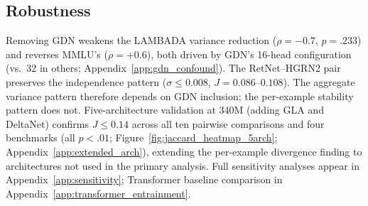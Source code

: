 \subsection{Robustness}\label{ssec:robustness}

Removing GDN weakens the LAMBADA variance reduction ($\rho = -0.7$, $p = .233$) and reverses MMLU's ($\rho = +0.6$), both driven by GDN's 16-head configuration (vs.\ 32 in others; Appendix~\ref{app:gdn_confound}). The RetNet--HGRN2 pair preserves the independence pattern ($\sigma \leq 0.008$, $J = 0.086$--$0.108$). The aggregate variance pattern therefore depends on GDN inclusion; the per-example stability pattern does not. Five-architecture validation at 340M (adding GLA and DeltaNet) confirms $J \leq 0.14$ across all ten pairwise comparisons and four benchmarks (all $p < .01$; Figure~\ref{fig:jaccard_heatmap_5arch}; Appendix~\ref{app:extended_arch}), extending the per-example divergence finding to architectures not used in the primary analysis. Full sensitivity analyses appear in Appendix~\ref{app:sensitivity}; Transformer baseline comparison in Appendix~\ref{app:transformer_entrainment}.
